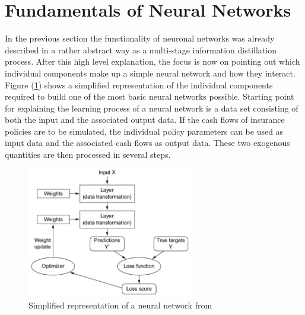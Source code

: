 \section{Fundamentals of Neural Networks}

In the previous section the functionality of neuronal networks was already described in a rather abstract way as a multi-stage information distillation process. After this high level explanation, the focus is now on pointing out which individual components make up a simple neural network and how they interact. Figure (\ref{fig:NN_overview}) shows a simplified representation of the individual components required to build one of the most basic neural networks possible. Starting point for explaining the learning process of a neural network is a data set consisting of both the input and the associated output data. If the cash flows of insurance policies are to be simulated, the individual policy parameters can be used as input data and the associated cash flows as output data. These two exogenous quantities are then processed in several steps.

\begin{figure}
	\centering
	\includegraphics[width=0.65\textwidth]{figures/chapter_NN/NN_overview}
	\caption{Simplified representation of a neural network from \cite{Allaire2018}}
	\label{fig:NN_overview}
\end{figure}


